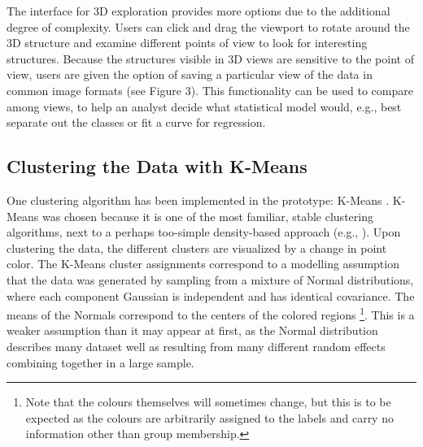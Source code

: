 \documentclass{sigchi}
\begin{document}
The interface for 3D exploration provides more options due to the additional degree of complexity. %
%
Users can click and drag the viewport to rotate around the 3D structure and examine different points of view to look for interesting structures. %
%
Because the structures visible in 3D views are sensitive to the point of view, users are given the option of saving a particular view of the data in common image formats (see Figure 3). %
%
This functionality can be used to compare among views, to help an analyst decide what statistical model would, e.g., best separate out the classes or fit a curve for regression.%
%
\subsection{Clustering the Data with K-Means}
%
One clustering algorithm has been implemented in the prototype: K-Means \cite{hartigan1979algorithm}. %
%
K-Means was chosen because it is one of the most familiar, stable clustering algorithms, next to a perhaps too-simple density-based approach (e.g., \cite{ester1996density}).
%
Upon clustering the data, the different clusters are visualized by a change in point color. 
%
The K-Means cluster assignments correspond to a modelling assumption that the data was generated by sampling from a mixture of Normal distributions, where each component Gaussian is independent and has identical covariance. %
%
The means of the Normals correspond to the centers of the colored regions%
%
\footnote{Note that the colours themselves will sometimes change, but this is to be expected as the colours are arbitrarily assigned to the labels and carry no information other than group membership.}. %
%
This is a weaker assumption than it may appear at first, as the Normal distribution describes many dataset well as resulting from many different random effects combining together in a large sample. %
%
\end{document}
